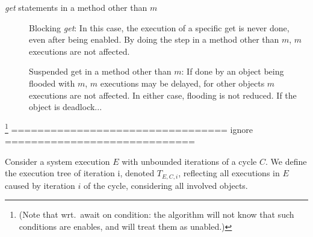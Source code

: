 {\begin{description}
\item[\emph{get} statements in a method other than $m$]
Blocking \emph{get}:
In this case, the  execution of a specific  get is never done,
even after being enabled.
By doing the step in a method other than $m$,
$m$ executions  are not affected.

   Suspended get in a method other than $m$: If done by an object
   being flooded with $m$, $m$ executions may be delayed, for other
   objects $m$ executions are not affected.  In either case, flooding
   is not reduced.  If the object is deadlock...
   \end{description}

   \footnote{(Note that wrt.\ await on condition:
   the algorithm will not know that such conditions are enables,
   and will treat them as unabled.)}
================================= ignore =============================}%
%
%
%



Consider a system execution $E$ %
with unbounded iterations of a cycle $C$.
We define the execution tree of iteration i, denoted $T_{E,C,i}$, reflecting 
all executions in $E$  caused by %
 iteration $i$ of the cycle, 
considering all %
involved objects.

